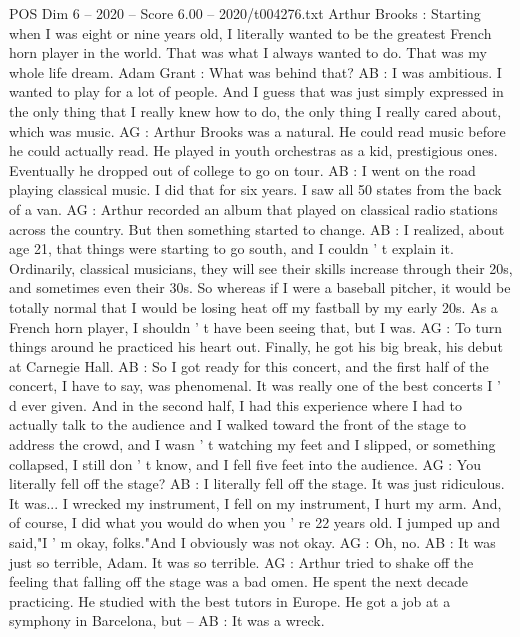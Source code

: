 \begin{textsample}{POS Dim 6 – 2020 – Score 6.00 – 2020/t004276.txt}  \label{ex:f6_pos_053}
Arthur Brooks : Starting when I was eight or nine years old, I literally wanted to be the greatest French horn player in the world.
That was what I always wanted to do.
That was my whole life dream.
Adam Grant : What was behind that?
AB : I was ambitious.
I wanted to play for a lot of people.
And I guess that was just simply expressed in the only thing that I really knew how to do, the only thing I really cared about, which was music.
AG : Arthur Brooks was a natural.
He could read music before he could actually read.
He played in youth orchestras as a kid, prestigious ones.
Eventually he dropped out of college to go on tour.
AB : I went on the road playing classical music.
I did that for six years.
I saw all 50 states from the back of a van.
AG : Arthur recorded an album that played on classical radio stations across the country.
But then something started to change.
AB : I realized, about age 21, that things were starting to go south, and I couldn ' t explain it.
Ordinarily, classical musicians, they will see their skills increase through their 20s, and sometimes even their 30s.
So whereas if I were a baseball pitcher, it would be totally normal that I would be losing heat off my fastball by my early 20s.
As a French horn player, I shouldn ' t have been seeing that, but I was.
AG : To turn things around he practiced his heart out.
Finally, he got his big break, his debut at Carnegie Hall.
AB : So I got ready for this concert, and the first half of the concert, I have to say, was phenomenal.
It was really one of the best concerts I ' d ever given.
And in the second half, I had this experience where I had to actually talk to the audience and I walked toward the front of the stage to address the crowd, and I wasn ' t watching my feet and I slipped, or something collapsed, I still don ' t know, and I fell five feet into the audience.
AG : You literally fell off the stage?
AB : I literally fell off the stage.
It was just ridiculous.
It was...
I wrecked my instrument, I fell on my instrument, I hurt my arm.
And, of course, I did what you would do when you ' re 22 years old.
I jumped up and said,"I ' m okay, folks."And I obviously was not okay.
AG : Oh, no.
AB : It was just so terrible, Adam.
It was so terrible.
AG : Arthur tried to shake off the feeling that falling off the stage was a bad omen.
He spent the next decade practicing.
He studied with the best tutors in Europe.
He got a job at a symphony in Barcelona, but -- AB : It was a wreck.

\end{textsample}
